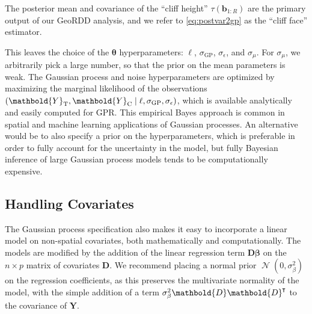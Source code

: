 \documentclass[letter,12pt]{article}
\DeclarePairedDelimiter{\parenthesis}{\lparen}{\rparen}
\newcommand{\del}[1]{\parenthesis*{#1}}
\let\Pr\relax
\DeclareMathOperator{\Pr}{\mathbb{P}}
\DeclareMathOperator{\normal}{\mathcal{N}}
\newcommand*{\trans}{^{\mkern-1.5mu\intercal}}
\newcommand{\treat}{\mathrm{T}}
\newcommand{\ctrol}{\mathrm{C}}
\newcommand{\sigmaf}{\sigma_{\mathrm{GP}}}
\newcommand{\sigman}{\sigma_{\epsilon}}
\newcommand{\sigmabeta}{\sigma_{\beta}}
\newcommand{\sigmamu}{\sigma_{\mu}}
\newcommand{\Yvec}{\mathbold{Y}}
\newcommand{\yt}{\Yvec_{\treat}}
\newcommand{\yc}{\Yvec_{\ctrol}}
\newcommand{\betavec}{\mathbold{\beta}}
\newcommand{\sentinel}{\bm{b}}
\newcommand{\numsent}{R}
\newcommand{\sentinels}{\sentinel_{1:\numsent}}
\newcommand{\hyperparam}{\bm{\theta}}
\newcommand{\Dmat}{\mathbold{D}}
\begin{document}
The posterior mean and covariance of the ``cliff height'' \(\tau(\sentinels)\) are the primary output of our GeoRDD analysis, and we refer to \eqref{eq:postvar2gp} as the ``cliff face'' estimator.



This leaves the choice of the \(\hyperparam\) hyperparameters: \(\ell\), \(\sigmaf\), \(\sigman\), and \(\sigmamu\).
For \(\sigmamu\), we arbitrarily pick a large number, so that the prior on the mean parameters is weak.
The Gaussian process and noise hyperparameters are optimized by maximizing the marginal likelihood of the observations \(\Pr\del{\yt, \yc \mid \ell, \sigmaf, \sigman}\), which is available analytically and easily computed for GPR.
This empirical Bayes approach is common in spatial and machine learning applications of Gaussian processes.
An alternative would be to also specify a prior on the hyperparameters, which is preferable in order to fully account for the uncertainty in the model, but fully Bayesian inference of large Gaussian process models tends to be computationally expensive.



\hypertarget{handling-covariates}{%
\subsection{Handling Covariates}\label{handling-covariates}}

\label{sec:covariates}

The Gaussian process specification also makes it easy to incorporate a linear model on non-spatial covariates, both mathematically and computationally.
The models are modified by the addition of the linear regression term \(\Dmat \betavec\) on the \(n \times p\) matrix of covariates \(\Dmat\).
We recommend placing a normal prior \(\normal(0,\sigmabeta^2)\) on the regression coefficients, as this preserves the multivariate normality of the model, with the simple addition of a term \(\sigma_\beta^2 \Dmat \Dmat\trans\) to the covariance of \(\Yvec\).
\end{document}
